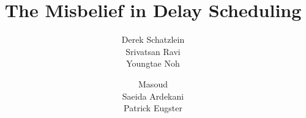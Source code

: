 \documentclass[conference,compsocconf,letterpaper]{sig-alternate-per}
\begin{document}


\title{The Misbelief in Delay Scheduling}


\author{
\alignauthor
Derek	Schatzlein\\
\alignauthor 
Srivatsan	Ravi\\
\alignauthor Youngtae	Noh\\
\and  %
\alignauthor Masoud	\\ Saeida Ardekani\\
\alignauthor Patrick	Eugster\\
}

 
\date{}
\maketitle



\begin{abstract}
%

\end{abstract}














%

%
%
 
\end{document}

